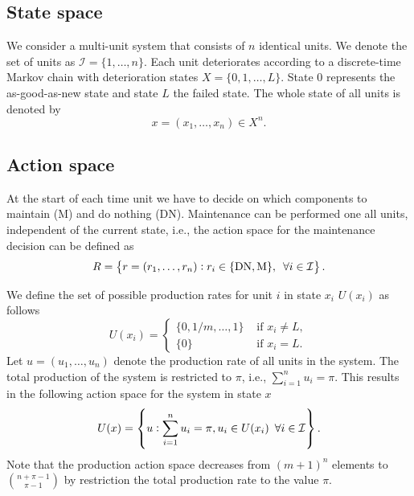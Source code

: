 \documentclass[a4paper,12pt]{article}
\begin{document}
\subsection{State space}
We consider a multi-unit system that consists of $n$ identical units. We denote the set of units as $\mathcal{I} = \{1, \dots, n\}$. Each unit deteriorates according to a discrete-time Markov chain with deterioration states $X = \{0, 1, \dots, L\}$. State $0$ represents the as-good-as-new state and state $L$ the failed state. The whole state of all units is denoted by
$$
x = (x_1, \dots, x_n) \in X^n.
$$

\subsection{Action space}
At the start of each time unit we have to decide on which components to maintain (M) and do nothing (DN). Maintenance can be performed one all units, independent of the current state, i.e., the action space for the maintenance decision can be defined as
$$
R = \left \{r = (r_1, \dots, r_n): r_i \in \{\text{DN}, \text{M}\}, \enskip \forall i \in \mathcal{I} \right \}.
$$

 We define the set of possible production rates for unit $i$ in state $x_i$ $U(x_i)$ as follows
$$
U(x_i) = \begin{cases}
\{0, 1/m, \dots, 1\} & \text{ if } x_i \neq L, \\
\{0\} & \text{ if } x_i = L.
\end{cases}
$$
Let $u = (u_1, \dots, u_n)$ denote the production rate of all units in the system. The total production of the system is restricted to $\pi$, i.e., $ \sum_{i=1}^{n}u_i = \pi$. This results in the following action space for the system in state $x$
$$
U(x) = \left\{ u  :  \sum_{i=1}^{n}u_i = \pi, u_i \in U(x_i) \enskip \forall i \in \mathcal{I} \right\}.
$$
Note that the production action space decreases from $(m+1)^n$ elements to ${n + \pi - 1} \choose{\pi - 1} $ by restriction the total production rate to the value $\pi$. 
\end{document}
